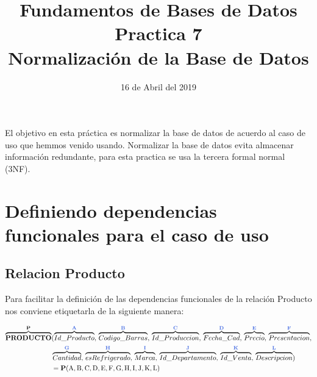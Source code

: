 \documentclass[10pt]{article}
\begin{document}
	
	\title{Fundamentos de Bases de Datos \\
		Practica 7\\ Normalización de la Base de Datos
	} 
	\author{}
	\date{16 de Abril del 2019}
	\maketitle
	

El objetivo en esta práctica es normalizar la base de datos de acuerdo al caso de uso que hemmos venido usando. Normalizar la base de datos evita almacenar información redundante,  para esta practica se usa la tercera formal normal (3NF).

\section{Definiendo dependencias funcionales para el caso de uso}

\subsection{Relacion Producto}




Para facilitar la definición de las dependencias funcionales de la relación Producto nos conviene etiquetarla de la siguiente manera:

\begin{align*}
\overbrace{ \textbf{PRODUCTO}}^{\textbf{{P}}}&(\overbrace{ Id\_Producto}^{\textbf{\textcolor{RoyalBlue}{A}}},\,\overbrace{Codigo\_Barras}^{\textbf{\textcolor{RoyalBlue}{B}}},\,\overbrace{Id\_Produccion}^{\textbf{\textcolor{RoyalBlue}{C}}},\,\overbrace{Fecha\_Cad}^{\textbf{\textcolor{RoyalBlue}{D}}},\,\overbrace{Precio}^{\textbf{\textcolor{RoyalBlue}{E}}},\,\overbrace{Presentacion}^{\textbf{\textcolor{RoyalBlue}{F}}},\\&\overbrace{Cantidad}^{\textbf{\textcolor{RoyalBlue}{G}}},\,\overbrace{esRefrigerado}^{\textbf{\textcolor{RoyalBlue}{H}}},\,\overbrace{Marca}^{\textbf{\textcolor{RoyalBlue}{I}}},\,\overbrace{Id\_Departamento}^{\textbf{\textcolor{RoyalBlue}{J}}},\,\overbrace{Id\_Venta}^{\textbf{\textcolor{RoyalBlue}{K}}},\,\overbrace{Descripcion}^{\textbf{\textcolor{RoyalBlue}{L}}})\\
&= \textbf{P}(\mathrm{A,B,C,D,E,F,G,H,I,J,K,L})
\end{align*}
\end{document}
